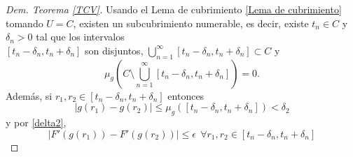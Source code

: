 \begin{proof}[Dem. Teorema \eqref{TCV}]
	Usando el Lema de cubrimiento \ref{Lema de  cubrimiento} tomando $U=C$, existen un subcubrimiento numerable, es decir, existe $t_n\in C$ y $\delta_{n}>0$ tal que los intervalos\\ $[t_n-\delta_n, t_n+\delta_n]$ son disjuntos, $\displaystyle\bigcup_{n=1}^{\infty}[t_n-\delta_n, t_n+\delta_n]\subset C$ y \begin{equation}\label{eq:cubrimiento}
	    \displaystyle\mu_{g}\left( C\setminus\bigcup_{n=1}^{\infty}[t_n-\delta_n, t_n+\delta_n]\right) =0.\end{equation}
Además, si $r_1,r_2\in[t_n-\delta_n, t_n+\delta_n]$ entonces 
	\begin{equation}
	|g(r_1)-g(r_2)|\leq \mu_{g}\left( [t_n-\delta_n, t_n+\delta_n]\right)<\delta_2
	\label{eq:cota de g(C)}
\end{equation}
	y por \eqref{delta2},
	\begin{equation}\label{eq:1}
	|F'(g(r_1))-F'(g(r_2))|\leq \epsilon\ \ \forall r_1,r_2\in [t_n-\delta_n, t_n+\delta_n]
\end{equation}
	

\end{proof}
